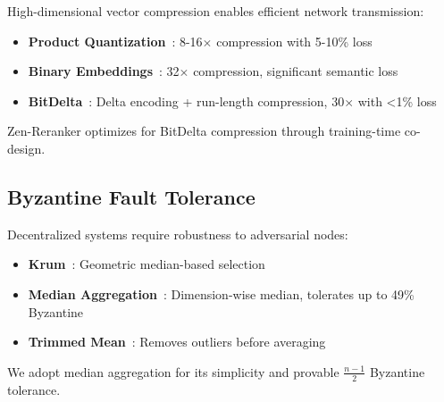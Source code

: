 High-dimensional vector compression enables efficient network transmission:

\begin{itemize}
\item \textbf{Product Quantization}~\cite{jegou2011pq}: 8-16$\times$ compression with 5-10\% loss
\item \textbf{Binary Embeddings}~\cite{shen2015binary}: 32$\times$ compression, significant semantic loss
\item \textbf{BitDelta}~\cite{hanzo2025bitdelta}: Delta encoding + run-length compression, 30$\times$ with <1\% loss
\end{itemize}

Zen-Reranker optimizes for BitDelta compression through training-time co-design.

\subsection{Byzantine Fault Tolerance}

Decentralized systems require robustness to adversarial nodes:

\begin{itemize}
\item \textbf{Krum}~\cite{blanchard2017krum}: Geometric median-based selection
\item \textbf{Median Aggregation}~\cite{yin2018median}: Dimension-wise median, tolerates up to 49\% Byzantine
\item \textbf{Trimmed Mean}~\cite{yin2018trimmed}: Removes outliers before averaging
\end{itemize}

We adopt median aggregation for its simplicity and provable $\frac{n-1}{2}$ Byzantine tolerance.

